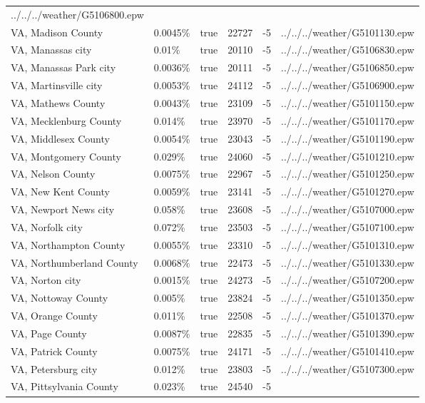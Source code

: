 \begin{longtable}[]{@{}llllll@{}}
../../../weather/G5106800.epw \\
VA, Madison County & 0.0045\% & true & 22727 & -5 &
../../../weather/G5101130.epw \\
VA, Manassas city & 0.01\% & true & 20110 & -5 &
../../../weather/G5106830.epw \\
VA, Manassas Park city & 0.0036\% & true & 20111 & -5 &
../../../weather/G5106850.epw \\
VA, Martinsville city & 0.0053\% & true & 24112 & -5 &
../../../weather/G5106900.epw \\
VA, Mathews County & 0.0043\% & true & 23109 & -5 &
../../../weather/G5101150.epw \\
VA, Mecklenburg County & 0.014\% & true & 23970 & -5 &
../../../weather/G5101170.epw \\
VA, Middlesex County & 0.0054\% & true & 23043 & -5 &
../../../weather/G5101190.epw \\
VA, Montgomery County & 0.029\% & true & 24060 & -5 &
../../../weather/G5101210.epw \\
VA, Nelson County & 0.0075\% & true & 22967 & -5 &
../../../weather/G5101250.epw \\
VA, New Kent County & 0.0059\% & true & 23141 & -5 &
../../../weather/G5101270.epw \\
VA, Newport News city & 0.058\% & true & 23608 & -5 &
../../../weather/G5107000.epw \\
VA, Norfolk city & 0.072\% & true & 23503 & -5 &
../../../weather/G5107100.epw \\
VA, Northampton County & 0.0055\% & true & 23310 & -5 &
../../../weather/G5101310.epw \\
VA, Northumberland County & 0.0068\% & true & 22473 & -5 &
../../../weather/G5101330.epw \\
VA, Norton city & 0.0015\% & true & 24273 & -5 &
../../../weather/G5107200.epw \\
VA, Nottoway County & 0.005\% & true & 23824 & -5 &
../../../weather/G5101350.epw \\
VA, Orange County & 0.011\% & true & 22508 & -5 &
../../../weather/G5101370.epw \\
VA, Page County & 0.0087\% & true & 22835 & -5 &
../../../weather/G5101390.epw \\
VA, Patrick County & 0.0075\% & true & 24171 & -5 &
../../../weather/G5101410.epw \\
VA, Petersburg city & 0.012\% & true & 23803 & -5 &
../../../weather/G5107300.epw \\
VA, Pittsylvania County & 0.023\% & true & 24540 & -5 &

\end{longtable}
